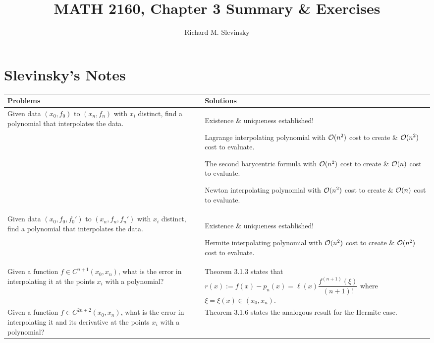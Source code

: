 \documentclass[11pt,letterpaper]{article}
\begin{document}
\title{MATH 2160, Chapter 3 Summary \& Exercises}
\author{Richard M. Slevinsky}
\date{}
\maketitle

\section*{Slevinsky's Notes}

\begin{longtable}{p{}|p{}}
\hline
Problems & Solutions\\
\hline
Given data $(x_0,f_0)$ to $(x_n,f_n)$ with $x_i$ distinct, find a polynomial that interpolates the data. & Existence \& uniqueness established!

Lagrange interpolating polynomial with $\mathcal{O}(n^2)$ cost to create \& $\mathcal{O}(n^2)$ cost to evaluate.

The second barycentric formula with $\mathcal{O}(n^2)$ cost to create \& $\mathcal{O}(n)$ cost to evaluate.

Newton interpolating polynomial with $\mathcal{O}(n^2)$ cost to create \& $\mathcal{O}(n)$ cost to evaluate.\\

Given data $(x_0,f_0,f_0')$ to $(x_n,f_n,f_n')$ with $x_i$ distinct, find a polynomial that interpolates the data. & Existence \& uniqueness established!

Hermite interpolating polynomial with $\mathcal{O}(n^2)$ cost to create \& $\mathcal{O}(n^2)$ cost to evaluate.\\

Given a function $f\in C^{n+1}(x_0,x_n)$, what is the error in interpolating it at the points $x_i$ with a polynomial? & Theorem 3.1.3 states that $r(x) := f(x) - p_n(x) = \ell(x)\dfrac{f^{(n+1)}(\xi)}{(n+1)!}$ where $\xi = \xi(x)\in(x_0,x_n)$.\\

Given a function $f\in C^{2n+2}(x_0,x_n)$, what is the error in interpolating it and its derivative at the points $x_i$ with a polynomial? & Theorem 3.1.6 states the analogous result for the Hermite case.\\


\end{longtable}
\end{document}
